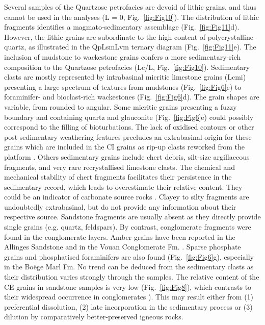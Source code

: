 \documentclass[twoside]{article}
\begin{document}
Several samples of the Quartzose petrofacies are devoid of lithic grains, and thus cannot be used in the analyses (L = 0, Fig.~\ref{fig:Fig10}). The distribution of lithic fragments identifies a magmato-sedimentary assemblage (Fig.~\ref{fig:Fig11}d). However, the lithic grains are subordinate to the high content of polycrystalline quartz, as illustrated in the QpLsmLvm ternary diagram (Fig.~\ref{fig:Fig11}e).
The inclusion of mudstone to wackestone grains confers a more sedimentary-rich composition to the Quartzose petrofacies (Lc/L, Fig.~\ref{fig:Fig10}). Sedimentary clasts are mostly represented by intrabasinal micritic limestone grains (Lcmi) presenting a large spectrum of textures from mudstones (Fig.~\ref{fig:Fig6}c) to foraminifer- and bioclast-rich wackestones (Fig.~\ref{fig:Fig6}d). The grain shapes are variable, from rounded to angular. Some micritic grains presenting a fuzzy boundary and containing quartz and glauconite (Fig.~\ref{fig:Fig6}e) could possibly correspond to the filling of bioturbations. The lack of oxidised contours or other post-sedimentary weathering features \citep{Zuffa1980} precludes an extrabasinal origin for these grains which are included in the CI grains as rip-up clasts reworked from the platform \citep{Garzanti1991}. Others sedimentary grains include chert debris, silt-size argillaceous fragments, and very rare recrystallised limestone clasts. The chemical and mechanical stability of chert fragments facilitates their persistence in the sedimentary record, which leads to overestimate their relative content. They could be an indicator of carbonate source rocks \citep{Mack1984}. Clayey to silty fragments are undoubtedly extrabasinal, but do not provide any information about their respective source. Sandstone fragments are usually absent as they directly provide single grains (e.g. quartz, feldspars). By contrast, conglomerate fragments were found in the conglomerate layers. Amber grains have been reported in the Allinges Sandstone \citep{deMortillet1863,Renevier1893b} and in the Vouan Conglomerate Fm. \citep{Pilloud1936}. Sparse phosphate grains and phosphatised foraminifers are also found (Fig.~\ref{fig:Fig6}g), especially in the Boëge Marl Fm. No trend can be deduced from the sedimentary clasts as their distribution varies strongly through the samples. The relative content of the CE grains in sandstone samples is very low (Fig.~\ref{fig:Fig8}), which contrasts to their widespread occurrence in conglomerates \citep{Cogulu1961,Winkler1983,Frebourg2006}). This may result either from (1) preferential dissolution, (2) late incorporation in the sedimentary process or (3) dilution by comparatively better-preserved igneous rocks.\par
\end{document}
